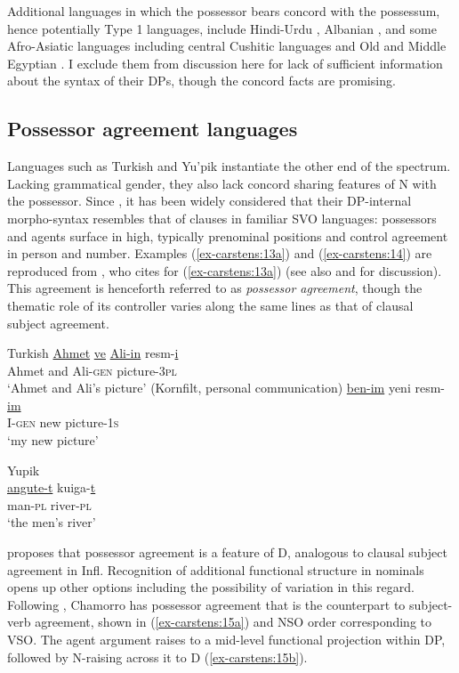 \documentclass[output=paper
,modfonts
,nonflat]{langsci/langscibook}
\begin{document}
\noindent Additional languages in which the possessor bears concord with the possessum, hence potentially Type 1 languages, include Hindi-Urdu \citep{Bogel_Butt2013}, Albanian \citep{Spencer2007}, and some Afro-Asiatic languages including central Cushitic languages \citep{Hetzron1995} and Old and Middle Egyptian \citep{Haspelmath2015}. I exclude them from discussion here for lack of sufficient information about the syntax of their DPs, though the concord facts are promising.

\subsection{Possessor agreement languages} \label{sec-carstens:2.2}
Languages such as Turkish and Yu'pik instantiate the other end of the spectrum. Lacking grammatical gender, they also lack concord sharing features of N with the possessor. Since \citet{Abney1987}, it has been widely considered that their DP-internal morpho-syntax resembles that of clauses in familiar SVO languages: possessors and agents surface in high, typically prenominal positions and control agreement in person and number. Examples (\ref{ex-carstens:13a}) and (\ref{ex-carstens:14}) are reproduced from \citet{Abney1987}, who cites \citet{Underhill1976} for (\ref{ex-carstens:13a}) (see also \citealt{Gavruseva2000} and \citealt{Haegeman2004} for discussion). This agreement is henceforth referred to as \textit{possessor agreement}, though the thematic role of its controller varies along the same lines as that of clausal subject agreement. 

\begin{exe}
	\ex Turkish \label{ex-carstens:13}
	\xlist
	\ex \label{ex-carstens:13a}
	\gll \uline{Ahmet} \uline{ve} \uline{Ali-in}     resm-\uline{i}  \\
	Ahmet and Ali-\textsc{gen}   picture-3\textsc{pl}\\
	\glt `Ahmet and Ali's picture'  	
	\ex (Kornfilt, personal communication)\label{ex-carstens:13b}\newline
	\gll \uline{ben-im}   yeni  resm-\uline{im}\\
	I-\textsc{gen}  new   picture-1\textsc{s}\\
	\glt `my new picture'
	\endxlist
\end{exe}

\begin{exe}
	\ex Yupik \label{ex-carstens:14}\\
	\gll \uline{angute-t}		kuiga-\uline{t}\\
	man-\textsc{pl}    river-\textsc{pl}\\
	\glt `the men's river'  	
\end{exe}
\citet{Abney1987} proposes that possessor agreement is a feature of D, analogous to clausal subject agreement in Infl. Recognition of additional functional structure in nominals opens up other options including the possibility of variation in this regard. Following \citet{Chung1982}, Chamorro has possessor agreement that is the counterpart to subject-verb agreement, shown in (\ref{ex-carstens:15a}) and NSO order corresponding to VSO. The agent argument raises to a mid-level functional projection within DP, followed by N-raising across it to D (\ref{ex-carstens:15b}).
\end{document}

